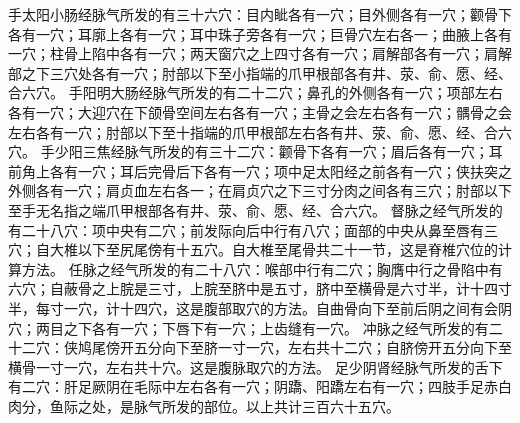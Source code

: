 \documentclass[a4paper,12pt,UTF8,twoside]{ctexbook}
\begin{document}
手太阳小肠经脉气所发的有三十六穴：目内眦各有一穴；目外侧各有一穴；颧骨下各有一穴；耳廓上各有一穴；耳中珠子旁各有一穴；巨骨穴左右各一；曲腋上各有一穴；柱骨上陷中各有一穴；两天窗穴之上四寸各有一穴；肩解部各有一穴；肩解部之下三穴处各有一穴；肘部以下至小指端的爪甲根部各有井、荥、俞、愿、经、合六穴。
手阳明大肠经脉气所发的有二十二穴；鼻孔的外侧各有一穴；项部左右各有一穴；大迎穴在下颌骨空间左右各有一穴；主骨之会左右各有一穴；髃骨之会左右各有一穴；肘部以下至十指端的爪甲根部左右各有井、荥、俞、愿、经、合六穴。
手少阳三焦经脉气所发的有三十二穴：颧骨下各有一穴；眉后各有一穴；耳前角上各有一穴；耳后完骨后下各有一穴；项中足太阳经之前各有一穴；侠扶突之外侧各有一穴；肩贞血左右各一；在肩贞穴之下三寸分肉之间各有三穴；肘部以下至手无名指之端爪甲根部各有井、荥、俞、愿、经、合六穴。
督脉之经气所发的有二十八穴：项中央有二穴；前发际向后中行有八穴；面部的中央从鼻至唇有三穴；自大椎以下至尻尾傍有十五穴。自大椎至尾骨共二十一节，这是脊椎穴位的计算方法。
任脉之经气所发的有二十八穴：喉部中行有二穴；胸膺中行之骨陷中有六穴；自蔽骨之上脘是三寸，上脘至脐中是五寸，脐中至横骨是六寸半，计十四寸半，每寸一穴，计十四穴，这是腹部取穴的方法。自曲骨向下至前后阴之间有会阴穴；两目之下各有一穴；下唇下有一穴；上齿缝有一穴。
冲脉之经气所发的有二十二穴：侠鸠尾傍开五分向下至脐一寸一穴，左右共十二穴；自脐傍开五分向下至横骨一寸一穴，左右共十穴。这是腹脉取穴的方法。
足少阴肾经脉气所发的舌下有二穴：肝足厥阴在毛际中左右各有一穴；阴蹻、阳蹻左右有一穴；四肢手足赤白肉分，鱼际之处，是脉气所发的部位。以上共计三百六十五穴。

\part{}
\end{document}
